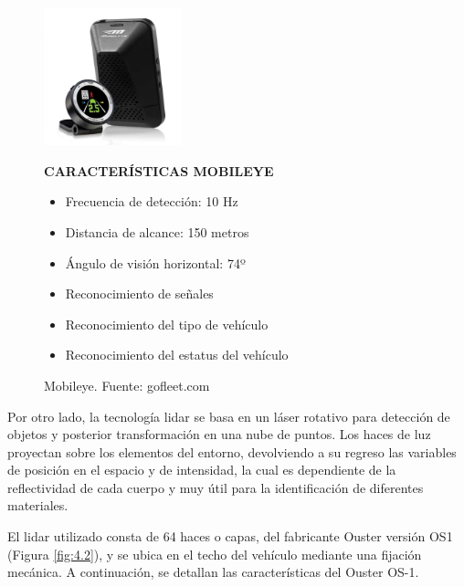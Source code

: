 \begin{figure}[htb]
\centering
\begin{minipage}{.4\textwidth}
    \includegraphics[width=4cm]{figures/4.1.jpg}
    \caption{Mobileye. Fuente: gofleet.com}
    \label{fig:4.1}
\end{minipage}
\begin{minipage}{.5\textwidth} 
\setlength{\parskip}{0.2cm}
\textbf{CARACTERÍSTICAS MOBILEYE}
\begin{itemize}
    \item Frecuencia de detección: 10 Hz
    \item Distancia de alcance: 150 metros
    \item Ángulo de visión horizontal: 74º
    \item Reconocimiento de señales
    \item Reconocimiento del tipo de vehículo
    \item Reconocimiento del estatus del vehículo
\end{itemize}
\end{minipage}
\end{figure}

Por otro lado, la tecnología \gls{lidar} se basa en un láser rotativo para detección de objetos y posterior transformación en una nube de puntos. Los haces de luz proyectan sobre los elementos del entorno, devolviendo a su regreso las variables de posición en el espacio y de intensidad, la cual es dependiente de la reflectividad de cada cuerpo y muy útil para la identificación de diferentes materiales.

El \gls{lidar} utilizado consta de 64 haces o capas, del fabricante Ouster versión OS1 (Figura \ref{fig:4.2}), y se ubica en el techo del vehículo mediante una fijación mecánica. A continuación, se detallan las características del Ouster OS-1.

